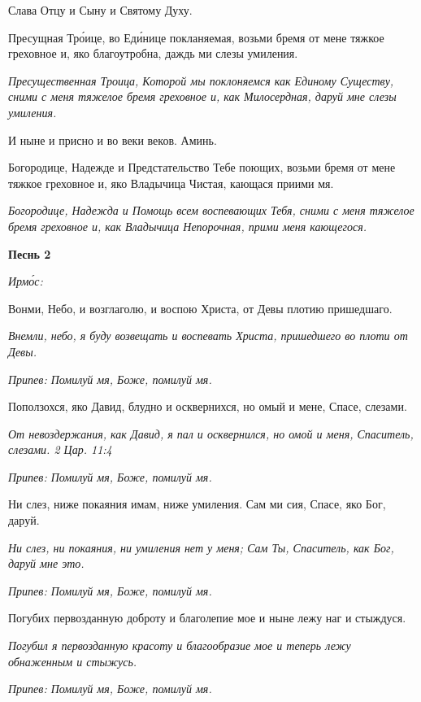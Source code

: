 Слава Отцу и Сыну и Святому Духу.


Пресущная Тро́ице, во Еди́нице покланяемая, возьми бремя от мене тяжкое греховное и, яко благоутробна, даждь ми слезы умиления.


\itshape Пресущественная Троица, Которой мы поклоняемся как Единому Существу, сними с меня тяжелое бремя греховное и, как Милосердная, даруй мне слезы умиления.\normalfont{}


И ныне и присно и во веки веков. Аминь.


Богородице, Надежде и Предстательство Тебе поющих, возьми бремя от мене тяжкое греховное и, яко Владычица Чистая, кающася приими мя.


\itshape Богородице, Надежда и Помощь всем воспевающих Тебя, сними с меня тяжелое бремя греховное и, как Владычица Непорочная, прими меня кающегося.\normalfont{}





\bfseries Песнь 2\normalfont{}


\itshape Ирмо́с:\normalfont{}


Вонми, Небо, и возглаголю, и воспою Христа, от Девы плотию пришедшаго.


\itshape Внемли, небо, я буду возвещать и воспевать Христа, пришедшего во плоти от Девы.\normalfont{}


\itshape Припев:\normalfont{} Помилуй мя, Боже, помилуй мя.


Поползохся, яко Давид, блудно и осквернихся, но омый и мене, Спасе, слезами.


\itshape От невоздержания, как Давид, я пал и осквернился, но омой и меня, Спаситель, слезами. 2 Цар. 11:4\normalfont{}


\itshape Припев:\normalfont{} Помилуй мя, Боже, помилуй мя.


Ни слез, ниже покаяния имам, ниже умиления. Сам ми сия, Спасе, яко Бог, даруй.


\itshape Ни слез, ни покаяния, ни умиления нет у меня; Сам Ты, Спаситель, как Бог, даруй мне это.\normalfont{}


\itshape Припев:\normalfont{} Помилуй мя, Боже, помилуй мя.


Погубих первозданную доброту и благолепие мое и ныне лежу наг и стыждуся.


\itshape Погубил я первозданную красоту и благообразие мое и теперь лежу обнаженным и стыжусь.\normalfont{}


\itshape Припев:\normalfont{} Помилуй мя, Боже, помилуй мя.


